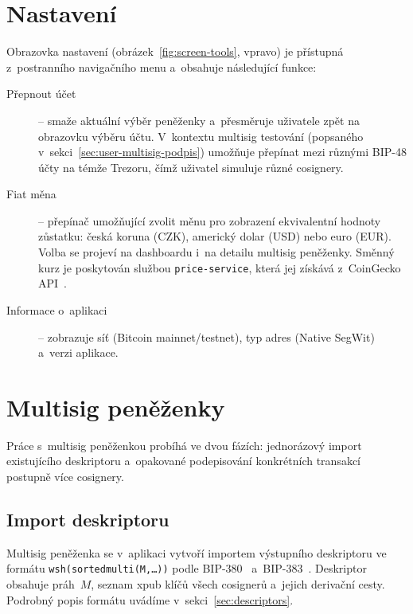\section{Nastavení}
\label{sec:user-nastaveni}

Obrazovka nastavení (obrázek~\ref{fig:screen-tools}, vpravo) je přístupná
z~postranního navigačního menu a~obsahuje následující funkce:

\begin{description}
\item[Přepnout účet] -- smaže aktuální výběr peněženky a~přesměruje
  uživatele zpět na obrazovku výběru účtu. V~kontextu multisig testování
  (popsaného v~sekci~\ref{sec:user-multisig-podpis}) umožňuje přepínat
  mezi různými BIP-48 účty na témže Trezoru, čímž uživatel simuluje
  různé cosignery.

\item[Fiat měna] -- přepínač umožňující zvolit měnu pro zobrazení
  ekvivalentní hodnoty zůstatku: česká koruna (CZK), americký dolar (USD)
  nebo euro (EUR). Volba se projeví na dashboardu i~na detailu multisig
  peněženky. Směnný kurz je poskytován službou \texttt{price-service},
  která jej získává z~CoinGecko API~\cite{CoinGeckoAPI}.

\item[Informace o~aplikaci] -- zobrazuje síť (Bitcoin mainnet/testnet),
  typ adres (Native SegWit) a~verzi aplikace.
\end{description}

\section{Multisig peněženky}
\label{sec:user-multisig}

Práce s~multisig peněženkou probíhá ve dvou fázích: jednorázový import
existujícího deskriptoru a~opakované podepisování konkrétních transakcí
postupně více cosignery.

\subsection{Import deskriptoru}
\label{sec:user-import}

Multisig peněženka se v~aplikaci vytvoří importem výstupního deskriptoru
ve formátu \texttt{wsh(sortedmulti(M,\ldots))} podle BIP-380~\cite{BIP380}
a~BIP-383~\cite{BIP383}. Deskriptor obsahuje práh~$M$, seznam xpub klíčů
všech cosignerů a~jejich derivační cesty. Podrobný popis formátu uvádíme
v~sekci~\ref{sec:descriptors}.

